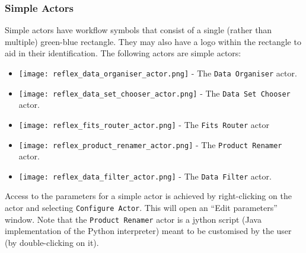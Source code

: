 \subsubsection{Simple Actors \label{sec:simple_actors}}

Simple actors have workflow symbols that consist of a single (rather than multiple) green-blue rectangle. They may also have a logo within the rectangle
to aid in their identification. The following actors are simple actors:
\begin{itemize}
\item{\texttt{[image: reflex\_data\_organiser\_actor.png]} - The {\tt Data Organiser} actor.}
\item{\texttt{[image: reflex\_data\_set\_chooser\_actor.png]} - The {\tt Data Set Chooser} actor.}
\item{\texttt{[image: reflex\_fits\_router\_actor.png]} - The {\tt Fits Router} actor}
\item{\texttt{[image: reflex\_product\_renamer\_actor.png]} - The {\tt Product Renamer} actor.}
\item{\texttt{[image: reflex\_data\_filter\_actor.png]} - The {\tt Data Filter} actor.}
\end{itemize}

Access to the parameters for a simple actor is achieved by
right-clicking on the actor and selecting {\tt Configure Actor}. This
will open an ``Edit parameters'' window. Note that the {\tt Product Renamer}
actor is a jython script (Java implementation of the Python
interpreter) meant to be customised by the user (by double-clicking on
it).

